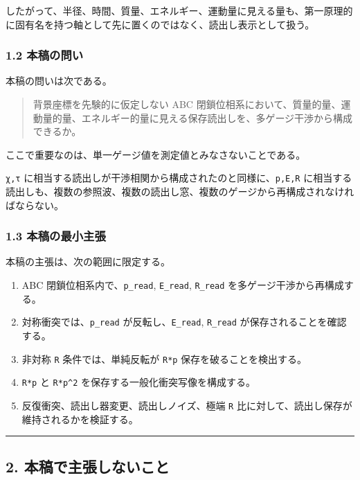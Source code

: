 \documentclass[
  a4paper,
]{article}
\providecommand{\tightlist}{%
  \setlength{\itemsep}{0pt}\setlength{\parskip}{0pt}}
\begin{document}
したがって、半径、時間、質量、エネルギー、運動量に見える量も、第一原理的に固有名を持つ軸として先に置くのではなく、読出し表示として扱う。

\subsubsection{1.2 本稿の問い}\label{ux672cux7a3fux306eux554fux3044}

本稿の問いは次である。

\begin{quote}
背景座標を先験的に仮定しない ABC
閉鎖位相系において、質量的量、運動量的量、エネルギー的量に見える保存読出しを、多ゲージ干渉から構成できるか。
\end{quote}

ここで重要なのは、単一ゲージ値を測定値とみなさないことである。

\texttt{χ,τ}
に相当する読出しが干渉相関から構成されたのと同様に、\texttt{p,E,R}
に相当する読出しも、複数の参照波、複数の読出し窓、複数のゲージから再構成されなければならない。

\subsubsection{1.3
本稿の最小主張}\label{ux672cux7a3fux306eux6700ux5c0fux4e3bux5f35}

本稿の主張は、次の範囲に限定する。

\begin{enumerate}
\def\labelenumi{\arabic{enumi}.}
\tightlist
\item
  ABC 閉鎖位相系内で、\texttt{p\_read}, \texttt{E\_read},
  \texttt{R\_read} を多ゲージ干渉から再構成する。
\item
  対称衝突では、\texttt{p\_read} が反転し、\texttt{E\_read},
  \texttt{R\_read} が保存されることを確認する。
\item
  非対称 \texttt{R} 条件では、単純反転が \texttt{R*p}
  保存を破ることを検出する。
\item
  \texttt{R*p} と \texttt{R*p\^{}2} を保存する一般化衝突写像を構成する。
\item
  反復衝突、読出し器変更、読出しノイズ、極端 \texttt{R}
  比に対して、読出し保存が維持されるかを検証する。
\end{enumerate}

\begin{center}\rule{0.5\linewidth}{0.5pt}\end{center}

\subsection{2.
本稿で主張しないこと}\label{ux672cux7a3fux3067ux4e3bux5f35ux3057ux306aux3044ux3053ux3068}
\end{document}
